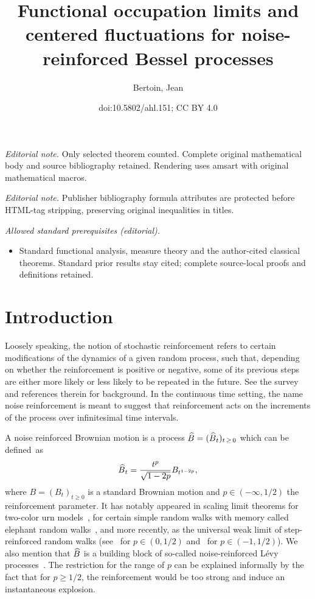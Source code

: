 \documentclass[10pt]{amsart}
\title{Functional occupation limits and centered fluctuations for noise-reinforced Bessel processes}
\author{Bertoin, Jean}
\date{doi:10.5802/ahl.151; CC BY 4.0}
\theoremstyle{definition}\newtheorem{defi}[theo]{Definition}\newtheorem{rema}[theo]{Remark}\newtheorem{exam}[theo]{Example}\newtheorem{exem}[theo]{Example}\newtheorem{nota}[theo]{Notation}
\renewcommand{\hat}[1]{\widehat{#1}}
\let\oldhat\hat
\renewcommand*{\hat}[1]{\mathchoice{\widehat{#1}}{\widehat{#1}}{\oldhat{#1}}{\oldhat{#1}}}
\begin{document}
\maketitle
\noindent\textit{Editorial note.} Only selected theorem counted. Complete original mathematical body and source bibliography retained. Rendering uses amsart with original mathematical macros.\par\medskip
\noindent\textit{Editorial note.} Publisher bibliography formula attributes are protected before HTML-tag stripping, preserving original inequalities in titles.\par\medskip
\noindent\textit{Allowed standard prerequisites (editorial).}\begin{itemize}
\item Standard functional analysis, measure theory and the author-cited classical theorems. Standard prior results stay cited; complete source-local proofs and definitions retained.
\end{itemize}\medskip


\section{Introduction}\label{sec:introduction}
Loosely speaking, the notion of stochastic reinforcement refers to certain modifications of the dynamics of a given random process, such that, depending on whether the reinforcement is positive or negative, some of its previous steps are either more likely or less likely to be repeated in the future. See the survey~\cite{Pem} and references therein for background. In the continuous time setting, the name noise reinforcement is meant to suggest that reinforcement acts on the increments of the process over infinitesimal time intervals.

A noise reinforced Brownian motion is a process $\hat B=(\hat B_t)_{t\,\geq\,0}$ which can be defined~as
\[
\hat B_t = \frac{t^{p}}{\sqrt{1-2p}}{B_{t^{1-2p}}},
\]
where $B=(B_t)_{t\geq 0}$ is a standard Brownian motion and $p\in(-\infty,1/2)$ the reinforcement parameter. It has notably appeared in scaling limit theorems for two-color urn models~\cite{BHZ,Gouet}, for certain simple random walks with memory called elephant random walks~\cite{BaurBer,ColGavSch2}, and more recently, as the universal weak limit of step-reinforced random walks (see~\cite{BerVla} for $p\in(0,1/2)$ and~\cite{BerRos} for $p\in(-1,1/2)$). We also mention that $\hat B$ is a building block of so-called noise-reinforced Lévy processes~\cite{NRLP}. The restriction for the range of $p$ can be explained informally by the fact that for $p\geq 1/2$, the reinforcement would be too strong and induce an instantaneous explosion.
\end{document}
